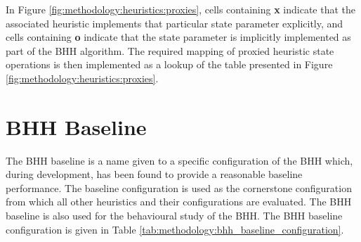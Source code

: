 In Figure \ref{fig:methodology:heuristics:proxies}, cells containing \textbf{x} indicate that the associated heuristic implements that particular state parameter explicitly, and cells containing \textbf{o} indicate that the state parameter is implicitly implemented as part of the \acs{BHH} algorithm. The required mapping of proxied heuristic state operations is then implemented as a lookup of the table presented in Figure \ref{fig:methodology:heuristics:proxies}.

\section{BHH Baseline}\label{sec:methodology:baseline_bhh}

The \acs{BHH} baseline is a name given to a specific configuration of the \acs{BHH} which, during development, has been found to provide a reasonable baseline performance. The baseline configuration is used as the cornerstone configuration from which all other heuristics and their configurations are evaluated. The \acs{BHH} baseline is also used for the behavioural study of the \acs{BHH}. The \acs{BHH} baseline configuration is given in Table \ref{tab:methodology:bhh_baseline_configuration}.

